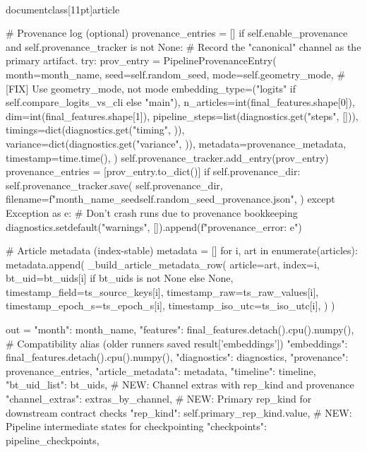 \\documentclass[11pt]{article}
\begin{document}
\begin{CodeBlock}
        # Provenance log (optional)
        provenance_entries = []
        if self.enable_provenance and self.provenance_tracker is not None:
            # Record the "canonical" channel as the primary artifact.
            try:
                prov_entry = PipelineProvenanceEntry(
                    month=month_name,
                    seed=self.random_seed,
                    mode=self.geometry_mode, # [FIX] Use geometry_mode, not mode
                    embedding_type=("logits" if self.compare_logits_vs_cli else "main"),
                    n_articles=int(final_features.shape[0]),
                    dim=int(final_features.shape[1]),
                    pipeline_steps=list(diagnostics.get("steps", [])),
                    timings=dict(diagnostics.get("timing", {})),
                    variance=dict(diagnostics.get("variance", {})),
                    metadata=provenance_metadata,
                    timestamp=time.time(),
                )
                self.provenance_tracker.add_entry(prov_entry)
                provenance_entries = [prov_entry.to_dict()]
                if self.provenance_dir:
                    self.provenance_tracker.save(
                        self.provenance_dir,
                        filename=f"{month_name}_seed{self.random_seed}_provenance.json",
                    )
            except Exception as e:
                # Don't crash runs due to provenance bookkeeping
                diagnostics.setdefault("warnings", []).append(f"provenance_error: {e}")

        # Article metadata (index-stable)
        metadata = []
        for i, art in enumerate(articles):
            metadata.append(
                _build_article_metadata_row(
                    article=art,
                    index=i,
                    bt_uid=bt_uids[i] if bt_uids is not None else None,
                    timestamp_field=ts_source_keys[i],
                    timestamp_raw=ts_raw_values[i],
                    timestamp_epoch_s=ts_epoch_s[i],
                    timestamp_iso_utc=ts_iso_utc[i],
                )
            )

        out = {
            "month": month_name,
            "features": final_features.detach().cpu().numpy(),
            # Compatibility alias (older runners saved result['embeddings'])
            "embeddings": final_features.detach().cpu().numpy(),
            "diagnostics": diagnostics,
            "provenance": provenance_entries,
            "article_metadata": metadata,
            "timeline": timeline,
            "bt_uid_list": bt_uids,
            # NEW: Channel extras with rep_kind and provenance
            "channel_extras": extras_by_channel,
            # NEW: Primary rep_kind for downstream contract checks
            "rep_kind": self.primary_rep_kind.value,
            # NEW: Pipeline intermediate states for checkpointing
            "checkpoints": pipeline_checkpoints,
        }


\end{CodeBlock}
\end{document}
